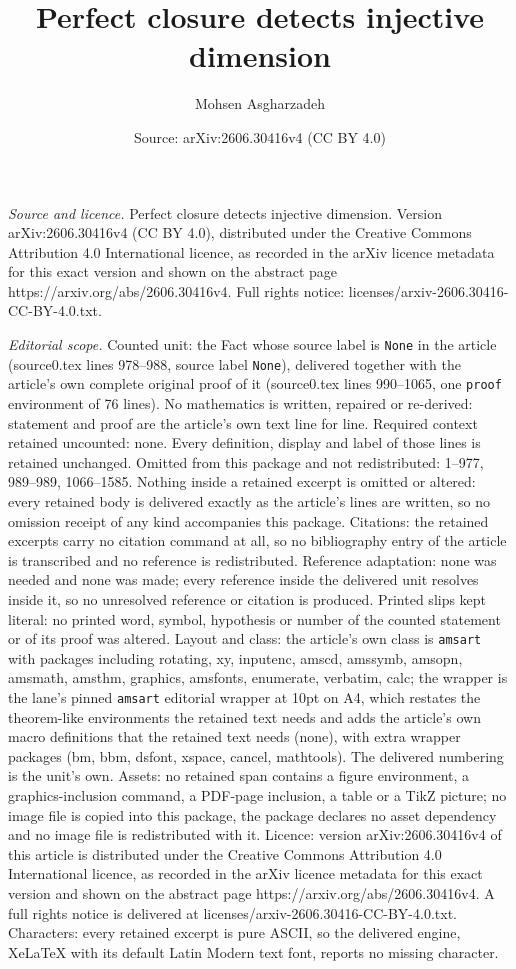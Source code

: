 \documentclass[10pt,a4paper]{amsart}
\title[Perfect closure detects injective dimension]{Perfect closure detects injective dimension}
\author{Mohsen Asgharzadeh}
\date{Source: arXiv:2606.30416v4 (CC BY 4.0)}
\begin{document}
\maketitle

\noindent\emph{Source and licence.} Perfect closure detects injective dimension. Version arXiv:2606.30416v4 (CC BY 4.0), distributed under the Creative Commons Attribution 4.0 International licence, as recorded in the arXiv licence metadata for this exact version and shown on the abstract page https://arxiv.org/abs/2606.30416v4. Full rights notice: licenses/arxiv-2606.30416-CC-BY-4.0.txt.\par\smallskip

\noindent\textit{Editorial scope.} Counted unit: the Fact whose source label is \texttt{None} in the article (source0.tex lines 978--988, source label \texttt{None}), delivered together with the article's own complete original proof of it (source0.tex lines 990--1065, one \texttt{proof} environment of 76 lines). No mathematics is written, repaired or re-derived: statement and proof are the article's own text line for line. Required context retained uncounted: none. Every definition, display and label of those lines is retained unchanged. Omitted from this package and not redistributed: 1--977, 989--989, 1066--1585. Nothing inside a retained excerpt is omitted or altered: every retained body is delivered exactly as the article's lines are written, so no omission receipt of any kind accompanies this package. Citations: the retained excerpts carry no citation command at all, so no bibliography entry of the article is transcribed and no reference is redistributed. Reference adaptation: none was needed and none was made; every reference inside the delivered unit resolves inside it, so no unresolved reference or citation is produced. Printed slips kept literal: no printed word, symbol, hypothesis or number of the counted statement or of its proof was altered. Layout and class: the article's own class is \texttt{amsart} with packages including rotating, xy, inputenc, amscd, amssymb, amsopn, amsmath, amsthm, graphics, amsfonts, enumerate, verbatim, calc; the wrapper is the lane's pinned \texttt{amsart} editorial wrapper at 10pt on A4, which restates the theorem-like environments the retained text needs and adds the article's own macro definitions that the retained text needs (none), with extra wrapper packages (bm, bbm, dsfont, xspace, cancel, mathtools). The delivered numbering is the unit's own. Assets: no retained span contains a figure environment, a graphics-inclusion command, a PDF-page inclusion, a table or a TikZ picture; no image file is copied into this package, the package declares no asset dependency and no image file is redistributed with it. Licence: version arXiv:2606.30416v4 of this article is distributed under the Creative Commons Attribution 4.0 International licence, as recorded in the arXiv licence metadata for this exact version and shown on the abstract page https://arxiv.org/abs/2606.30416v4. A full rights notice is delivered at licenses/arxiv-2606.30416-CC-BY-4.0.txt. Characters: every retained excerpt is pure ASCII, so the delivered engine, XeLaTeX with its default Latin Modern text font, reports no missing character.
\end{document}
